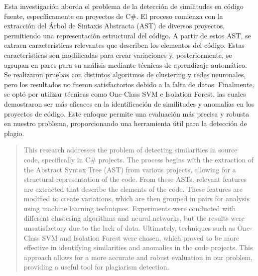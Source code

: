 \begin{resumen}
 Esta investigación aborda el problema de la detección de similitudes en código fuente, específicamente en proyectos de C\#. El proceso comienza con la extracción del Árbol de Sintaxis Abstracta (AST) de diversos proyectos, permitiendo una representación estructural del código. A partir de estos AST, se extraen características relevantes que describen los elementos del código. Estas características son modificadas para crear variaciones y, posteriormente, se agrupan en pares para su análisis mediante técnicas de aprendizaje automático. Se realizaron pruebas con distintos algoritmos de clustering y redes neuronales, pero los resultados no fueron satisfactorios debido a la falta de datos. Finalmente, se optó por utilizar técnicas como One-Class SVM e Isolation Forest, las cuales demostraron ser más eficaces en la identificación de similitudes y anomalías en los proyectos de código. Este enfoque permite una evaluación más precisa y robusta en nuestro problema, proporcionando una herramienta útil para la detección de plagio.
\end{resumen}

\begin{abstract}
	This research addresses the problem of detecting similarities in source code, specifically in C\# projects. The process begins with the extraction of the Abstract Syntax Tree (AST) from various projects, allowing for a structural representation of the code. From these ASTs, relevant features are extracted that describe the elements of the code. These features are modified to create variations, which are then grouped in pairs for analysis using machine learning techniques. Experiments were conducted with different clustering algorithms and neural networks, but the results were unsatisfactory due to the lack of data. Ultimately, techniques such as One-Class SVM and Isolation Forest were chosen, which proved to be more effective in identifying similarities and anomalies in the code projects. This approach allows for a more accurate and robust evaluation in our problem, providing a useful tool for plagiarism detection.
\end{abstract}